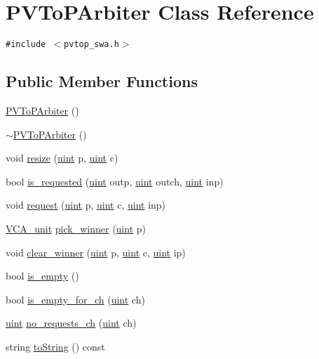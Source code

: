 \hypertarget{classPVToPArbiter}{
\section{PVToPArbiter Class Reference}
\label{classPVToPArbiter}
}
{\tt \#include $<$pvtop\_\-swa.h$>$}

\subsection*{Public Member Functions}
\begin{CompactItemize}
\item 
\hyperlink{classPVToPArbiter_0cbecd7c187fb89df14024e437dff5ac}{PVToPArbiter} ()
\item 
\hyperlink{classPVToPArbiter_b76ac84d5073dbef1413d51d40d9e4de}{$\sim$PVToPArbiter} ()
\item 
void \hyperlink{classPVToPArbiter_bd33e2445fa794bdee2613d545b4f3bd}{resize} (\hyperlink{outputBuffer_8h_91ad9478d81a7aaf2593e8d9c3d06a14}{uint} p, \hyperlink{outputBuffer_8h_91ad9478d81a7aaf2593e8d9c3d06a14}{uint} c)
\item 
bool \hyperlink{classPVToPArbiter_5a653ce30ac803621098e9b5f3c42d3c}{is\_\-requested} (\hyperlink{outputBuffer_8h_91ad9478d81a7aaf2593e8d9c3d06a14}{uint} outp, \hyperlink{outputBuffer_8h_91ad9478d81a7aaf2593e8d9c3d06a14}{uint} outch, \hyperlink{outputBuffer_8h_91ad9478d81a7aaf2593e8d9c3d06a14}{uint} inp)
\item 
void \hyperlink{classPVToPArbiter_56e573c1e63d5016323e359c1f42468f}{request} (\hyperlink{outputBuffer_8h_91ad9478d81a7aaf2593e8d9c3d06a14}{uint} p, \hyperlink{outputBuffer_8h_91ad9478d81a7aaf2593e8d9c3d06a14}{uint} c, \hyperlink{outputBuffer_8h_91ad9478d81a7aaf2593e8d9c3d06a14}{uint} inp)
\item 
\hyperlink{classVCA__unit}{VCA\_\-unit} \hyperlink{classPVToPArbiter_a51339b2519b84caa8fd27e49f8a240c}{pick\_\-winner} (\hyperlink{outputBuffer_8h_91ad9478d81a7aaf2593e8d9c3d06a14}{uint} p)
\item 
void \hyperlink{classPVToPArbiter_1c82a296b196922859802d453c91a734}{clear\_\-winner} (\hyperlink{outputBuffer_8h_91ad9478d81a7aaf2593e8d9c3d06a14}{uint} p, \hyperlink{outputBuffer_8h_91ad9478d81a7aaf2593e8d9c3d06a14}{uint} c, \hyperlink{outputBuffer_8h_91ad9478d81a7aaf2593e8d9c3d06a14}{uint} ip)
\item 
bool \hyperlink{classPVToPArbiter_18a0ad4791e9ad5f0360be68d5068ba3}{is\_\-empty} ()
\item 
bool \hyperlink{classPVToPArbiter_e7d0a9f761895e79ea20eabb03b30698}{is\_\-empty\_\-for\_\-ch} (\hyperlink{outputBuffer_8h_91ad9478d81a7aaf2593e8d9c3d06a14}{uint} ch)
\item 
\hyperlink{outputBuffer_8h_91ad9478d81a7aaf2593e8d9c3d06a14}{uint} \hyperlink{classPVToPArbiter_57136c1a881be827b1e5a844e09021f9}{no\_\-requests\_\-ch} (\hyperlink{outputBuffer_8h_91ad9478d81a7aaf2593e8d9c3d06a14}{uint} ch)
\item 
string \hyperlink{classPVToPArbiter_8d61d75160f4350efc07d7783e31e19b}{toString} () const 
\end{CompactItemize}
